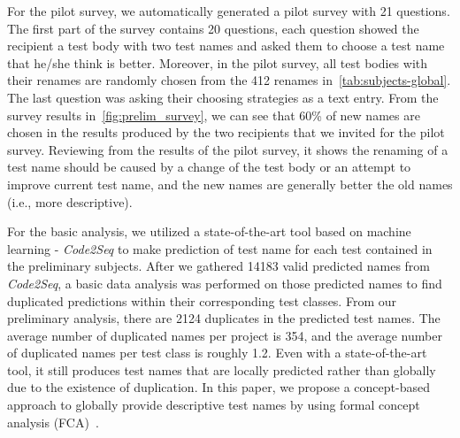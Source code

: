 \documentclass[proposal.tex]{subfiles}
\begin{document}
For the pilot survey, we automatically generated a pilot survey with 21 questions.
%
The first part of the survey contains 20 questions, each question showed the recipient a test body with two test names and asked them to choose a test name that he/she think is better.
%
Moreover, in the pilot survey, all test bodies with their renames are randomly chosen from the \num{412} renames in~\cref{tab:subjects-global}.
%
The last question was asking their choosing strategies as a text entry.
%
From the survey results in~\cref{fig:prelim_survey}, we can see that \num{60}\% of new names are chosen in the results produced by the two recipients that we invited for the pilot survey.
%
Reviewing from the results of the pilot survey, it shows the renaming of a test name should be caused by a change of the test body or an attempt to improve current test name, and the new names are generally better the old names (i.e., more descriptive).


For the basic analysis, we utilized a state-of-the-art tool based on machine learning - \textit{Code2Seq} to make prediction of test name for each test contained in the preliminary subjects.
%
After we gathered \num{14183} valid predicted names from \textit{Code2Seq}, a basic data analysis was performed on those predicted names to find duplicated predictions within their corresponding test classes.
%
From our preliminary analysis, there are \num{2124} duplicates in the predicted test names.
%
The average number of duplicated names per project is \num{354}, and the average number of duplicated names per test class is roughly \num{1.2}.
%
Even with a state-of-the-art tool, it still produces test names that are locally predicted rather than globally due to the existence of duplication.
%
In this paper, we propose a concept-based approach to globally provide descriptive test names by using formal concept analysis (FCA)~\cite{tonella2004formal}.
\end{document}
